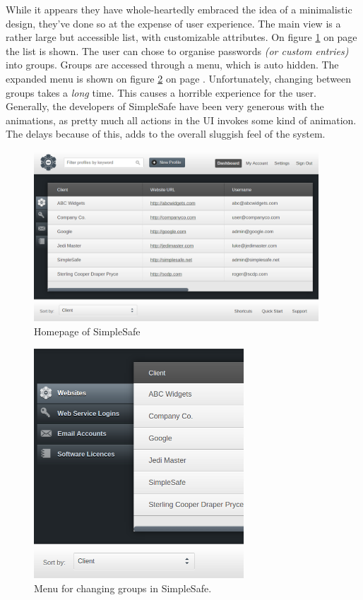 			While it appears they have whole-heartedly embraced the idea of a minimalistic design, they've done so at the expense of user experience. The main view is a rather large but accessible list, with customizable attributes. On figure \ref{fig:simplesafe_main} on page \pageref{fig:simplesafe_main} the list is shown. The user can chose to organise passwords \emph{(or custom entries)} into groups. Groups are accessed through a menu, which is auto hidden. The expanded menu is shown on figure \ref{fig:simplesafe_menu} on page \pageref{fig:simplesafe_menu}. Unfortunately, changing between groups takes a \emph{long} time. This causes a horrible experience for the user. Generally, the developers of SimpleSafe have been very generous with the animations, as pretty much all actions in the UI invokes some kind of animation. The delays because of this, adds to the overall sluggish feel of the system.

			\begin{figure}[htbp]
				\centering
				\includegraphics[width=0.95\textwidth]{figures/analysis/simplesafe_main.png}
				\caption{Homepage of SimpleSafe}
				\label{fig:simplesafe_main}
			\end{figure}

			\begin{figure}[htbp]
				\centering
				\includegraphics[width=0.70\textwidth]{figures/analysis/simplesafe_groups.png}
				\caption{Menu for changing groups in SimpleSafe.}
				\label{fig:simplesafe_menu}
			\end{figure}

